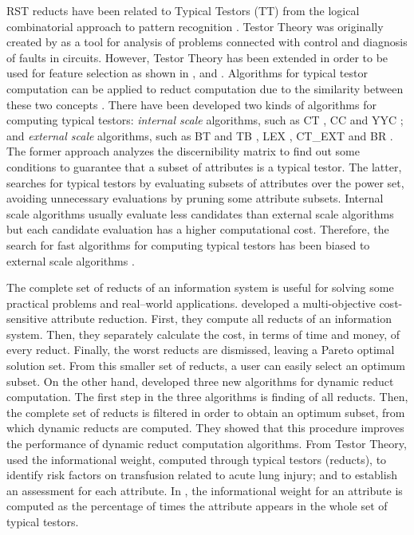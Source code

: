 \documentclass[authoryear,preprint,review,12pt]{elsarticle}
\begin{document}
  RST reducts have been related to Typical Testors (TT) from the logical combinatorial approach 
  to pattern recognition \citep{Chikalov2013}. Testor Theory was originally created by \cite{Cheguis55} as a tool
  for analysis of problems connected with control and diagnosis of faults in circuits. 
  However, Testor Theory has been extended in order to be used for feature selection as shown in \citep{Dmitriev1966}, \citep{Martinez01} and \citep{Ruiz08}. Algorithms for typical testor computation can be applied to reduct computation due to the similarity between these two concepts \citep{Lazo15}. There have been developed two kinds of algorithms for computing typical testors: \emph{internal scale} algorithms, such as CT \citep{Bravo83}, CC \citep{Aguila84} and YYC \citep{Alba14}; and \emph{external scale} algorithms, such as BT and TB \citep{Ruiz85}, LEX \citep{Santiesteban03}, CT\_EXT \citep{Sanchez07} and BR \citep{Lias09}. The former approach analyzes the discernibility matrix to find out some conditions to guarantee that a subset of attributes is a typical testor. The latter, searches for typical testors by evaluating subsets of attributes over the power set, avoiding unnecessary evaluations by pruning some attribute subsets. Internal scale algorithms usually evaluate less candidates than external scale algorithms but each candidate evaluation has a higher computational cost. Therefore, the search for fast algorithms for computing typical testors has been biased to external scale algorithms \citep{Alba14}.
    
  The complete set of reducts of an information system is useful for solving some practical problems and real--world applications. \cite{Xu2013} developed a multi-objective cost-sensitive attribute reduction. First, they compute all reducts of an information system. Then, they separately calculate the cost, in terms of time and money, of every reduct. Finally, the worst reducts are dismissed, leaving a Pareto optimal solution set. From this smaller set of reducts, a user can easily select an optimum subset. On the other hand, \cite{Mukamakuza2014} developed three new algorithms for dynamic reduct computation. 
  The first step in the three algorithms is finding of all reducts. Then, the complete set of reducts 
  is filtered in order to obtain an optimum subset, from which dynamic reducts are computed. They showed that 
  this procedure improves the performance of dynamic reduct computation algorithms.	
  From Testor Theory, \cite{Torres2014} used the informational weight, computed through typical testors 
  (reducts), to identify risk factors on transfusion related to acute lung injury; and to establish an assessment
  for each attribute.  In \citep{Torres2014}, the informational weight for an attribute is computed as the percentage of times the attribute appears in the whole set of typical testors. 
	
\end{document}
